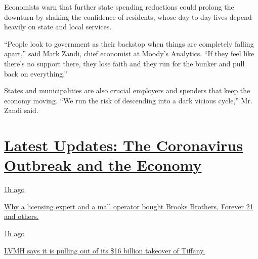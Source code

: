 Economists warn that further state spending reductions could prolong the
downturn by shaking the confidence of residents, whose day-to-day lives
depend heavily on state and local services.

``People look to government as their backstop when things are completely
falling apart,'' said Mark Zandi, chief economist at Moody's Analytics.
``If they feel like there's no support there, they lose faith and they
run for the bunker and pull back on everything.''

States and municipalities are also crucial employers and spenders that
keep the economy moving. ``We run the risk of descending into a dark
vicious cycle,'' Mr. Zandi said.

\hypertarget{latest-updates-the-coronavirus-outbreak-and-the-economy}{%
\section{\texorpdfstring{\href{https://www.nytimes3xbfgragh.onion/live/2020/09/09/business/stock-market-today-coronavirus?action=click\&pgtype=Article\&state=default\&region=MAIN_CONTENT_1\&context=storylines_live_updates}{Latest
Updates: The Coronavirus Outbreak and the
Economy}}{Latest Updates: The Coronavirus Outbreak and the Economy}}\label{latest-updates-the-coronavirus-outbreak-and-the-economy}}

\href{https://www.nytimes3xbfgragh.onion/live/2020/09/09/business/stock-market-today-coronavirus?action=click\&pgtype=Article\&state=default\&region=MAIN_CONTENT_1\&context=storylines_live_updates\#why-a-licensing-expert-and-a-mall-operator-bought-brooks-brothers-forever-21-and-others}{1h
ago}

\href{https://www.nytimes3xbfgragh.onion/live/2020/09/09/business/stock-market-today-coronavirus?action=click\&pgtype=Article\&state=default\&region=MAIN_CONTENT_1\&context=storylines_live_updates\#why-a-licensing-expert-and-a-mall-operator-bought-brooks-brothers-forever-21-and-others}{Why
a licensing expert and a mall operator bought Brooks Brothers, Forever
21 and others.}

\href{https://www.nytimes3xbfgragh.onion/live/2020/09/09/business/stock-market-today-coronavirus?action=click\&pgtype=Article\&state=default\&region=MAIN_CONTENT_1\&context=storylines_live_updates\#lvmh-says-it-is-pulling-out-of-its-16-billion-takeover-of-tiffany}{1h
ago}

\href{https://www.nytimes3xbfgragh.onion/live/2020/09/09/business/stock-market-today-coronavirus?action=click\&pgtype=Article\&state=default\&region=MAIN_CONTENT_1\&context=storylines_live_updates\#lvmh-says-it-is-pulling-out-of-its-16-billion-takeover-of-tiffany}{LVMH
says it is pulling out of its \$16 billion takeover of Tiffany.}

